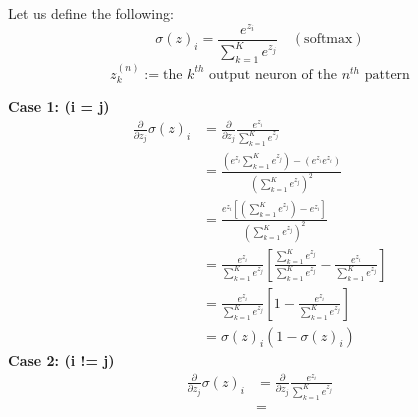 \begin{enumerate}[label=(\alph*)]
	      \begin{tcolorbox}[title={Solution}]
		      Let us define the following:
		      $$ \sigma(z)_i = \frac{e^{z_i}}{\sum_{k = 1}^K e^{z_j}}
			      \quad (\text{softmax})$$
		      $$ z_k^{(n)} := \text{the } k^{th}\text{ output neuron of the }
			      n^{th} \text{ pattern}$$

		      \begin{tcolorbox}[title={Derivative of Softmax}]
			      \textbf{Case 1: (i = j)}
			      $$
				      \begin{aligned}
					      \frac{\partial}{\partial z_j}\sigma(z)_i & =
					      \frac{\partial}{\partial z_j} \frac{e^{z_i}}{\sum_{k =
					      1}^K e^{z_j}}                                \\
					                                               & =
					      \frac{(e^{z_i} \sum_{k =
							      1}^K e^{z_j}) - (e^{z_i} e^{z_i})}{(\sum_{k =
					      1}^K e^{z_j})^2}                             \\
					                                               & =
					      \frac{e^{z_i} \left[ \left( \sum_{k =
								      1}^K e^{z_j}\right) - e^{z_i} \right]}{(\sum_{k =
					      1}^K e^{z_j})^2}                             \\
					                                               & =
					      \frac{e^{z_i}}{\sum_{k =
							      1}^K e^{z_j}}
					      \left[
						      \frac{\sum_{k =
								      1}^K e^{z_j}}{\sum_{k =
								      1}^K e^{z_j}}
						      -
						      \frac{e^{z_i}}{\sum_{k =
								      1}^K e^{z_j}}
					      \right]                                      \\
					                                               & =
					      \frac{e^{z_i}}{\sum_{k =
							      1}^K e^{z_j}}
					      \left[
						      1	-
						      \frac{e^{z_i}}{\sum_{k =
								      1}^K e^{z_j}}
					      \right]                                      \\
					                                               & =
					      \sigma(z)_i \left(1 - \sigma(z)_i \right)
				      \end{aligned}
			      $$
			      \textbf{Case 2: (i != j)}
			      $$
				      \begin{aligned}
					      \frac{\partial}{\partial z_j}\sigma(z)_i & =
					      \frac{\partial}{\partial z_j} \frac{e^{z_i}}{\sum_{k =
					      1}^K e^{z_j}}                                  \\
					                                               & =

\end{aligned}$$
\end{tcolorbox}
\end{tcolorbox}
\end{enumerate}

